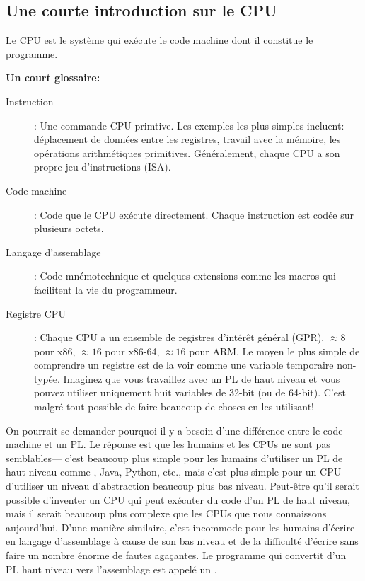\subsection{Une courte introduction sur le CPU}

Le \ac{CPU} est le système qui exécute le code machine dont il constitue le programme.

\textbf{Un court glossaire:}

\begin{description}
\item[Instruction]: Une commande \ac{CPU} primtive.
Les exemples les plus simples incluent: déplacement de données entre les registres, travail avec la mémoire, les opérations arithmétiques primitives.
Généralement, chaque \ac{CPU} a son propre jeu d'instructions (\ac{ISA}).

\item[Code machine]: Code que le \ac{CPU} exécute directement. 
Chaque instruction est codée sur plusieurs octets.
\item[Langage d'assemblage]: Code mnémotechnique et quelques extensions comme les macros qui facilitent la vie du programmeur.
\item[Registre CPU]: Chaque \ac{CPU} a un ensemble de registres d'intérêt général (\ac{GPR}).
$\approx 8$ pour x86, $\approx 16$ pour x86-64, $\approx 16$ pour ARM.
Le moyen le plus simple de comprendre un registre est de la voir comme une variable temporaire non-typée.
Imaginez que vous travaillez avec un \ac{PL} de haut niveau et vous pouvez utiliser uniquement huit variables de 32-bit (ou de 64-bit).
C'est malgré tout possible de faire beaucoup de choses en les utilisant!
\end{description}


On pourrait se demander pourquoi il y a besoin d'une différence entre le code machine et un \ac{PL}. Le réponse est que les humains et les \ac{CPU}s ne sont pas semblables---%
c'est beaucoup plus simple pour les humains d'utiliser un \ac{PL} de haut niveau comme \CCpp, Java, Python, etc., mais c'est plus simple pour un \ac{CPU} d'utiliser un niveau d'abstraction beaucoup plus bas niveau.
Peut-être qu'il serait possible d'inventer un \ac{CPU} qui peut exécuter du code d'un \ac{PL} de haut niveau, mais il serait beaucoup plus complexe que les \ac{CPU}s que nous connaissons aujourd'hui.
D'une manière similaire, c'est incommode pour les humains d'écrire en langage d'assemblage à cause de son bas niveau et de la difficulté d'écrire sans faire un nombre énorme de fautes agaçantes.
Le programme qui convertit d'un \ac{PL} haut niveau vers l'assemblage est appelé un .

